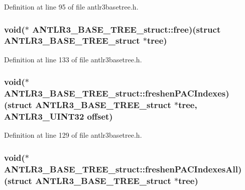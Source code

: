 Definition at line 95 of file antlr3basetree.\-h.

\hypertarget{struct_a_n_t_l_r3___b_a_s_e___t_r_e_e__struct_a6106dc049d14a08ea8c73e34f45d279f}{
\subsubsection[{free}]{\setlength{\rightskip}{0pt plus 5cm}void($\ast$ A\-N\-T\-L\-R3\-\_\-\-B\-A\-S\-E\-\_\-\-T\-R\-E\-E\-\_\-struct\-::free)(struct {\bf A\-N\-T\-L\-R3\-\_\-\-B\-A\-S\-E\-\_\-\-T\-R\-E\-E\-\_\-struct} $\ast$tree)}}\label{struct_a_n_t_l_r3___b_a_s_e___t_r_e_e__struct_a6106dc049d14a08ea8c73e34f45d279f}


Definition at line 133 of file antlr3basetree.\-h.

\hypertarget{struct_a_n_t_l_r3___b_a_s_e___t_r_e_e__struct_ab705dcb2ebc64aac65cfc2c5e740a8d6}{
\subsubsection[{freshen\-P\-A\-C\-Indexes}]{\setlength{\rightskip}{0pt plus 5cm}void($\ast$ A\-N\-T\-L\-R3\-\_\-\-B\-A\-S\-E\-\_\-\-T\-R\-E\-E\-\_\-struct\-::freshen\-P\-A\-C\-Indexes)(struct {\bf A\-N\-T\-L\-R3\-\_\-\-B\-A\-S\-E\-\_\-\-T\-R\-E\-E\-\_\-struct} $\ast$tree, {\bf A\-N\-T\-L\-R3\-\_\-\-U\-I\-N\-T32} {\bf offset})}}\label{struct_a_n_t_l_r3___b_a_s_e___t_r_e_e__struct_ab705dcb2ebc64aac65cfc2c5e740a8d6}


Definition at line 129 of file antlr3basetree.\-h.

\hypertarget{struct_a_n_t_l_r3___b_a_s_e___t_r_e_e__struct_abf09a0cacce150d43eea1a66ff9ad10b}{
\subsubsection[{freshen\-P\-A\-C\-Indexes\-All}]{\setlength{\rightskip}{0pt plus 5cm}void($\ast$ A\-N\-T\-L\-R3\-\_\-\-B\-A\-S\-E\-\_\-\-T\-R\-E\-E\-\_\-struct\-::freshen\-P\-A\-C\-Indexes\-All)(struct {\bf A\-N\-T\-L\-R3\-\_\-\-B\-A\-S\-E\-\_\-\-T\-R\-E\-E\-\_\-struct} $\ast$tree)}}\label{struct_a_n_t_l_r3___b_a_s_e___t_r_e_e__struct_abf09a0cacce150d43eea1a66ff9ad10b}


